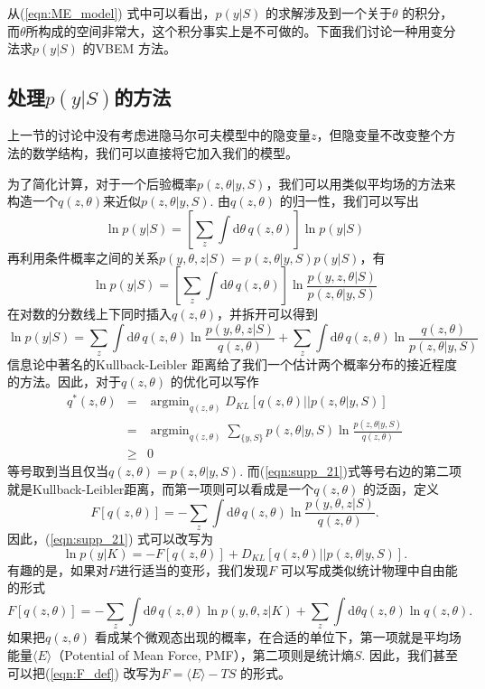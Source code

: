 \documentclass[11pt, a4paper]{article}
\DeclareMathOperator*{\argmin}{argmin}
\begin{document}
    从(\ref{eqn:ME_model}) 式中可以看出，$p(y|S)$ 的求解涉及到一个关于$\theta$ 的积分，而$\theta$所构成的空间非常大，这个积分事实上是不可做的。下面我们讨论一种用变分法求$p(y|S)$ 的VBEM 方法。

    \subsection{处理$p(y|S)$的方法}
    上一节的讨论中没有考虑进隐马尔可夫模型中的隐变量$z$，但隐变量不改变整个方法的数学结构，我们可以直接将它加入我们的模型。

    为了简化计算，对于一个后验概率$p(z,\theta|y, S)$，我们可以用类似平均场的方法来构造一个$q(z,\theta)$来近似$p(z,\theta|y, S)$. 由$q(z,\theta)$ 的归一性，我们可以写出
    $$\ln p(y|S) = \left[\sum_z\int \mathrm d\theta\, q(z,\theta)\right]\ln p(y|S)$$
    再利用条件概率之间的关系$p(y,\theta,z|S) = p(z,\theta|y, S)p(y|S)$，有
    $$\ln p(y|S) = \left[\sum_z\int \mathrm d\theta\, q(z,\theta)\right]\ln \frac{p(y,z,\theta|S)}{p(z,\theta|y,S)}$$
    在对数的分数线上下同时插入$q(z,\theta)$，并拆开可以得到
    \begin{equation}\label{eqn:supp_21}
      \ln p(y|S) = \sum_z\int \mathrm d\theta\, q(z,\theta)\ln\frac{p(y,\theta,z|S)}{q(z,\theta)}+\sum_z\int \mathrm d\theta\, q(z,\theta)\ln\frac{q(z,\theta)}{p(z,\theta|y,S)}
    \end{equation}
    信息论中著名的Kullback-Leibler 距离给了我们一个估计两个概率分布的接近程度的方法。因此，对于$q(z,\theta)$ 的优化可以写作
    \begin{eqnarray*}
      q^*(z,\theta) &=& \argmin_{q(z,\theta)} D_{KL}[q(z,\theta) || p(z,\theta|y,S)] \\
                    &=& \argmin_{q(z,\theta)}\sum_{\{y,S\}} p(z,\theta|y,S)\ln\frac{p(z,\theta|y,S)}{q(z,\theta)}\\
                    &\ge& 0
    \end{eqnarray*}
    等号取到当且仅当$q(z,\theta) = p(z,\theta|y, S)$. 而(\ref{eqn:supp_21})式等号右边的第二项就是Kullback-Leibler距离，而第一项则可以看成是一个$q(z,\theta)$ 的泛函，定义
    \begin{equation}\label{eqn:F_def}
      F[q(z,\theta)] = -\sum_z\int \mathrm d\theta\, q(z,\theta)\ln\frac{p(y,\theta,z|S)}{q(z,\theta)}.
    \end{equation}
    因此，(\ref{eqn:supp_21}) 式可以改写为
    \begin{equation}\label{eqn:supp_24}
      \ln p(y|K)= -F[q(z,\theta)] +D_{KL}[q(z,\theta)||p(z,\theta| y, S)].
    \end{equation}
    有趣的是，如果对$F$进行适当的变形，我们发现$F$ 可以写成类似统计物理中自由能的形式
    $$F[q(z,\theta)] = -\sum_z\int \mathrm d\theta\, q(z,\theta)\ln p(y,\theta,z|K) + \sum_z\int \mathrm d\theta q(z,\theta)\ln q(z,\theta).$$
    如果把$q(z,\theta)$ 看成某个微观态出现的概率，在合适的单位下，第一项就是平均场能量$\langle E\rangle$（Potential of Mean Force, PMF），第二项则是统计熵$S$. 因此，我们甚至可以把(\ref{eqn:F_def}) 改写为$F=\langle E\rangle -TS$ 的形式。
\end{document}
